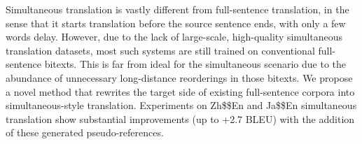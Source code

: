 Simultaneous translation is vastly different from full-sentence translation, in the sense that it starts translation before the source sentence ends, with only a few words delay. However, due to the lack of large-scale, high-quality simultaneous translation datasets, most such systems are still trained on conventional full-sentence bitexts. This is far from ideal for the simultaneous scenario due to the abundance of unnecessary long-distance reorderings in those bitexts. We propose a novel method that rewrites the target side of existing full-sentence corpora into simultaneous-style translation. Experiments on Zh\$\rightarrow\$En and Ja\$\rightarrow\$En simultaneous translation show substantial improvements (up to +2.7 BLEU) with the addition of these generated pseudo-references.
